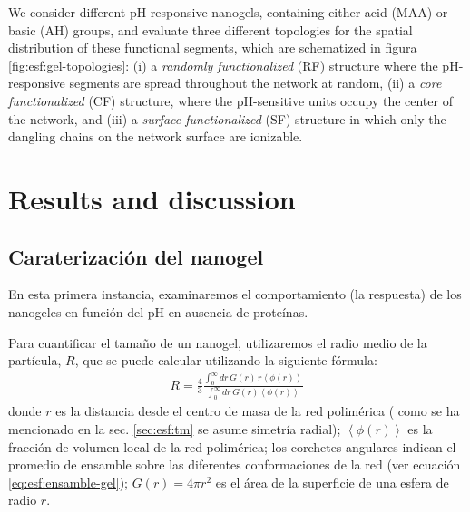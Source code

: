 We consider different pH-responsive nanogels, containing either acid (MAA) or basic (AH) groups, and evaluate three different topologies for the spatial distribution of these functional  segments, which are schematized in figura \ref{fig:esf:gel-topologies}: 
(i) a \emph{randomly functionalized} (RF) structure where the pH-responsive segments are spread throughout the network  at random,
(ii) a \emph{core functionalized} (CF) structure, where the  pH-sensitive units occupy the center of the network, and 
(iii) a \emph{surface functionalized} (SF) structure in which only the dangling chains on the network surface  are ionizable. 

 
 
  







\section{Results and discussion}






\subsection{Caraterizaci\'on del nanogel}

En esta primera instancia, examinaremos el comportamiento (la respuesta) de los nanogeles en funci\'on del pH en ausencia de prote\'inas.

Para cuantificar el tama\~no de un nanogel, utilizaremos el radio medio de la part\'icula, $R$, que se puede calcular utilizando la siguiente fórmula:
\begin{align}
	R = \frac{4}{3}\frac{\int_0^\infty{dr\,G(r)\,r \left<\phi(r)\right>}}{\int_0^\infty{dr\,G(r)\left<\phi(r)\right>}}
\end{align}
\noindent donde $r$ es la distancia desde el centro de masa de la red polim\'erica ( como se ha mencionado en la sec. \ref{sec:esf:tm} se asume simetr\'ia radial);
$\left<\phi(r)\right>$ es la fracción de volumen local de la red polim\'erica;
los corchetes angulares indican el promedio de ensamble sobre las diferentes conformaciones de la red (ver ecuación \ref{eq:esf:ensamble-gel});
$G(r)=4\pi r^2$ es el \'area de la superficie de una esfera de radio $r$.

